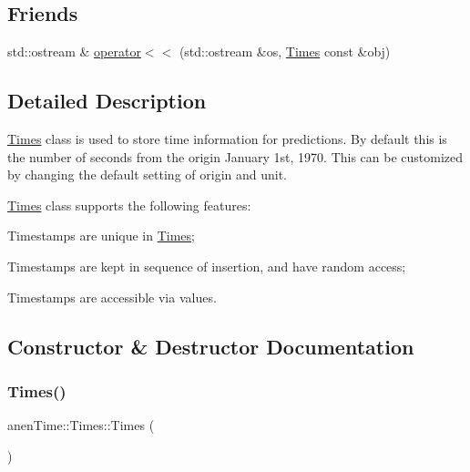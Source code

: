\subsection*{Friends}
\begin{DoxyCompactItemize}
\item 
std\+::ostream \& \mbox{\hyperlink{classanen_time_1_1_times_a0c37c7d9833e9b02d1a219555f55fe34}{operator$<$$<$}} (std\+::ostream \&os, \mbox{\hyperlink{classanen_time_1_1_times}{Times}} const \&obj)
\end{DoxyCompactItemize}


\subsection{Detailed Description}
\mbox{\hyperlink{classanen_time_1_1_times}{Times}} class is used to store time information for predictions. By default this is the number of seconds from the origin January 1st, 1970. This can be customized by changing the default setting of origin and unit. 

\mbox{\hyperlink{classanen_time_1_1_times}{Times}} class supports the following features\+:
\begin{DoxyEnumerate}
\item Timestamps are unique in \mbox{\hyperlink{classanen_time_1_1_times}{Times}};
\item Timestamps are kept in sequence of insertion, and have random access;
\item Timestamps are accessible via values. 
\end{DoxyEnumerate}

\subsection{Constructor \& Destructor Documentation}
\mbox{\label{classanen_time_1_1_times_a66161eb232f580fe090579b8e19e3618}} 
\subsubsection{\texorpdfstring{Times()}{Times()}\hspace{0.1cm}{\footnotesize\ttfamily [1/3]}}
{\footnotesize\ttfamily anen\+Time\+::\+Times\+::\+Times (\begin{DoxyParamCaption}{ }\end{DoxyParamCaption})}

